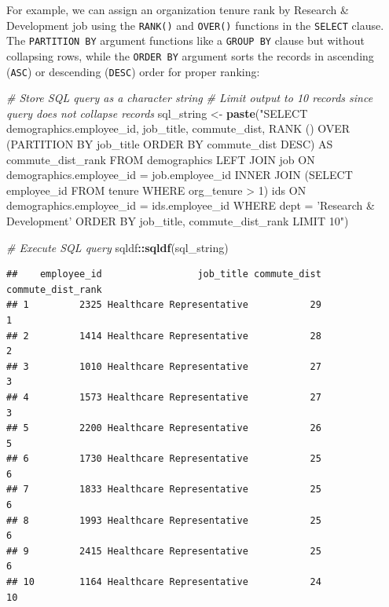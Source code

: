 \documentclass[]{book}
\newenvironment{Shaded}{\begin{snugshade}}{\end{snugshade}}
\newcommand{\CommentTok}[1]{\textcolor[rgb]{0.56,0.35,0.01}{\textit{#1}}}
\newcommand{\KeywordTok}[1]{\textcolor[rgb]{0.13,0.29,0.53}{\textbf{#1}}}
\newcommand{\NormalTok}[1]{#1}
\newcommand{\OperatorTok}[1]{\textcolor[rgb]{0.81,0.36,0.00}{\textbf{#1}}}
\newcommand{\StringTok}[1]{\textcolor[rgb]{0.31,0.60,0.02}{#1}}
\begin{document}
For example, we can assign an organization tenure rank by Research \& Development job using the \texttt{RANK()} and \texttt{OVER()} functions in the \texttt{SELECT} clause. The \texttt{PARTITION\ BY} argument functions like a \texttt{GROUP\ BY} clause but without collapsing rows, while the \texttt{ORDER\ BY} argument sorts the records in ascending (\texttt{ASC}) or descending (\texttt{DESC}) order for proper ranking:

\begin{Shaded}
\begin{Highlighting}[]
\CommentTok{# Store SQL query as a character string}
\CommentTok{# Limit output to 10 records since query does not collapse records}
\NormalTok{sql_string <-}\StringTok{ }\KeywordTok{paste}\NormalTok{(}\StringTok{"SELECT}
\StringTok{                      demographics.employee_id,}
\StringTok{                      job_title,}
\StringTok{                      commute_dist,}
\StringTok{                      RANK () OVER (PARTITION BY job_title ORDER BY commute_dist DESC) AS commute_dist_rank}
\StringTok{                    FROM}
\StringTok{                        demographics}
\StringTok{                      LEFT JOIN}
\StringTok{                        job}
\StringTok{                      ON}
\StringTok{                        demographics.employee_id = job.employee_id}
\StringTok{                      INNER JOIN}
\StringTok{                        (SELECT employee_id FROM tenure WHERE org_tenure > 1) ids}
\StringTok{                      ON}
\StringTok{                        demographics.employee_id = ids.employee_id}
\StringTok{                    WHERE}
\StringTok{                      dept = 'Research & Development'}
\StringTok{                    ORDER BY}
\StringTok{                      job_title,}
\StringTok{                      commute_dist_rank}
\StringTok{                    LIMIT 10"}\NormalTok{)}

\CommentTok{# Execute SQL query}
\NormalTok{sqldf}\OperatorTok{::}\KeywordTok{sqldf}\NormalTok{(sql_string)}
\end{Highlighting}
\end{Shaded}

\begin{verbatim}
##    employee_id                 job_title commute_dist commute_dist_rank
## 1         2325 Healthcare Representative           29                 1
## 2         1414 Healthcare Representative           28                 2
## 3         1010 Healthcare Representative           27                 3
## 4         1573 Healthcare Representative           27                 3
## 5         2200 Healthcare Representative           26                 5
## 6         1730 Healthcare Representative           25                 6
## 7         1833 Healthcare Representative           25                 6
## 8         1993 Healthcare Representative           25                 6
## 9         2415 Healthcare Representative           25                 6
## 10        1164 Healthcare Representative           24                10
\end{verbatim}
\end{document}
